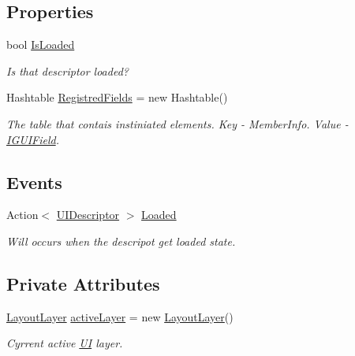 \subsection*{Properties}
\begin{DoxyCompactItemize}
\item 
bool \mbox{\hyperlink{class_wpf_handler_1_1_u_i_1_1_auto_layout_1_1_u_i_descriptor_a2e1bd8a01df4160b293fd79f639ce962}{Is\+Loaded}}
\begin{DoxyCompactList}\small\item\em Is that descriptor loaded? \end{DoxyCompactList}\item 
Hashtable \mbox{\hyperlink{class_wpf_handler_1_1_u_i_1_1_auto_layout_1_1_u_i_descriptor_a6c63f0a13186cb7eae1928ec8907aea2}{Registred\+Fields}} = new Hashtable()
\begin{DoxyCompactList}\small\item\em The table that contais instiniated elements. Key -\/ Member\+Info. Value -\/ \mbox{\hyperlink{interface_wpf_handler_1_1_u_i_1_1_auto_layout_1_1_i_g_u_i_field}{I\+G\+U\+I\+Field}}. \end{DoxyCompactList}\end{DoxyCompactItemize}
\subsection*{Events}
\begin{DoxyCompactItemize}
\item 
Action$<$ \mbox{\hyperlink{class_wpf_handler_1_1_u_i_1_1_auto_layout_1_1_u_i_descriptor}{U\+I\+Descriptor}} $>$ \mbox{\hyperlink{class_wpf_handler_1_1_u_i_1_1_auto_layout_1_1_u_i_descriptor_abaa60ede8bf9e59734238f1beadaf50e}{Loaded}}
\begin{DoxyCompactList}\small\item\em Will occurs when the descripot get loaded state. \end{DoxyCompactList}\end{DoxyCompactItemize}
\subsection*{Private Attributes}
\begin{DoxyCompactItemize}
\item 
\mbox{\hyperlink{class_wpf_handler_1_1_u_i_1_1_auto_layout_1_1_layout_layer}{Layout\+Layer}} \mbox{\hyperlink{class_wpf_handler_1_1_u_i_1_1_auto_layout_1_1_u_i_descriptor_a5870ffc200ecb9f352cb250b497b3df2}{active\+Layer}} = new \mbox{\hyperlink{class_wpf_handler_1_1_u_i_1_1_auto_layout_1_1_layout_layer}{Layout\+Layer}}()
\begin{DoxyCompactList}\small\item\em Cyrrent active \mbox{\hyperlink{namespace_wpf_handler_1_1_u_i}{UI}} layer. \end{DoxyCompactList}\end{DoxyCompactItemize}


